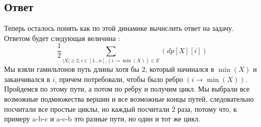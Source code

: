 \documentclass{article}
\begin{document}
\subsection*{Ответ}
Теперь осталось понять как по этой динамике вычислить ответ на задачу.
Ответом будет следующая величина : $$\frac{1}{2}\sum_{|X| \geq 2, i \in [1\dots n], (i \to \min(X)) \in E}(dp[X][i])$$
Мы взяли гамильтонов путь длины хотя бы $2$, который начинался в $\min(X)$ и заканчивался в $i$, причем потребовали, чтобы было ребро $(i \to \min(X))$. Пройдемся по этому пути, а потом по ребру и получим цикл. Мы выбрали все возможные подмножества вершин и все возможные концы путей, следовательно посчитали все простые циклы, но каждый посчитали $2$ раза, потому что, к примеру a-b-c и a-c-b это разные пути, но один и тот же цикл.
\end{document}
